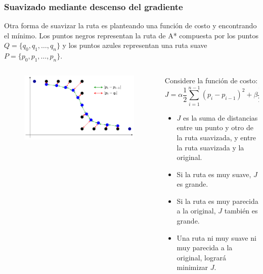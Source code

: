 \documentclass[10pt,spanish,aspectratio=1610]{beamer}
\begin{document}
\begin{frame}\frametitle{Suavizado mediante descenso del gradiente}
  Otra forma de suavizar la ruta es planteando una función de costo y encontrando el mínimo. Los puntos negros representan la ruta de A* compuesta por los puntos $Q=\{q_0, q_1, \dots, q_n\}$ y los puntos azules representan una ruta suave $P=\{p_0, p_1,\dots, p_n\}$.
  \begin{columns}
    \begin{column}{0.5\textwidth}
      \begin{figure}
        \centering
        \includegraphics[width=\textwidth]{Figures/PathSmoothing.pdf}
      \end{figure}
    \end{column}
    \begin{column}{0.5\textwidth}
      Considere la función de costo:
      \[J = \alpha\frac{1}{2}\sum_{i=1}^{n-1}\left(p_i - p_{i-1}\right)^2 + \beta\frac{1}{2}\sum_{i=1}^{n-1}(p_i - q_i)^2\]
      \begin{itemize}
      \item $J$ es la suma de distancias entre un punto y otro de la ruta suavizada, y entre la ruta suavizada y la original.
      \item Si la ruta es muy suave, $J$ es grande.
      \item Si la ruta es muy parecida a la original, $J$ también es grande.
      \item Una ruta ni muy suave ni muy parecida a la original, logrará minimizar $J$.
      \end{itemize}
    \end{column}
  \end{columns}
\end{frame}
\end{document}
